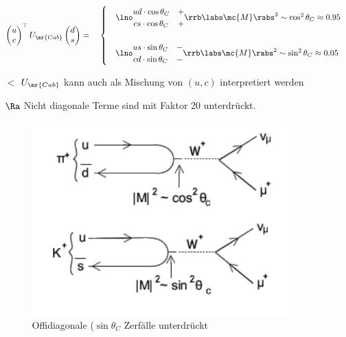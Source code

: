 \begin{itemize}
\begin{itemize}
\begin{align}
\begin{pmatrix}
u \\ c
\end{pmatrix}^\top U_\mr{Cab} \begin{pmatrix}
d \\ s
\end{pmatrix}=\quad \begin{cases}\quad 
\lno \begin{matrix}
ud \cdot \cos \theta_C & +\\ cs \cdot \cos\theta_C & +
\end{matrix} \rrb \labs \mc{M}\rabs^2 \sim \cos^2 \theta_C \approx 0.95\\ \ \\
\quad \lno \begin{matrix}
us \cdot \sin \theta_C & -\\ cd \cdot \sin\theta_C & -
\end{matrix} \rrb \labs \mc{M}\rabs^2 \sim \sin^2 \theta_C \approx 0.05 \end{cases}
\end{align}
\item[$\lt$] $U_\mr{Cab}$ kann auch als Mischung von $(u,c)$ interpretiert werden
\item[$\Ra$] \glqq Nicht diagonale\grqq{} Terme sind mit Faktor 20 unterdrückt.
\begin{figure}[!ht]
\centering
\includegraphics[width=.5\textwidth]{imgs/ep5-fig-8-3.pdf}
\caption{Offidiagonale ($\sin \theta_C$ Zerfälle unterdrückt \label{fig:8.3}}
\end{figure}


\end{itemize}
\end{itemize}
